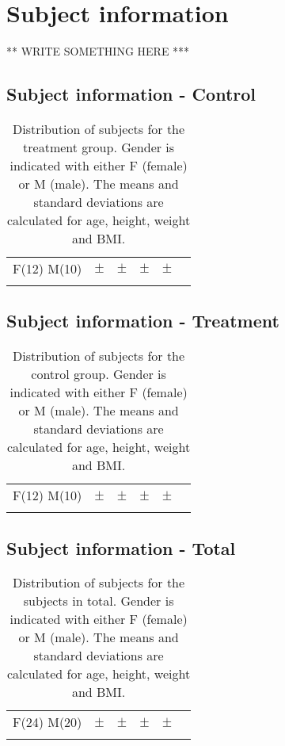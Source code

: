 \section{Subject information}

** WRITE SOMETHING HERE ***

\subsection{Subject information - Control}
\begin{longtable}{l|c|c|c|c|c}
	\rowcolor[HTML]{C0C0C0} \rule{0pt}{3ex}  \color[HTML]{000000}{Gender} & \color[HTML]{000000}{Age} & \color[HTML]{000000}{Weight} & \color[HTML]{000000}{Height} &  \color[HTML]{000000}{BMI} 
	\\ \hline \rule{0pt}{3ex} 
	F(12) M(10) & $\pm$ & $\pm$  &  $\pm$ &  $\pm$ 
	\\ \hline 
	\caption{Distribution of subjects for the treatment group. Gender is indicated with either F (female) or M (male). The means and standard deviations are calculated for age, height, weight and BMI.}
	\label{tab:subjects}
\end{longtable}
\vspace{-.5cm}


\subsection{Subject information - Treatment}
\begin{longtable}{l|c|c|c|c|c}
	\rowcolor[HTML]{C0C0C0} \rule{0pt}{3ex}  \color[HTML]{000000}{Gender} & \color[HTML]{000000}{Age} & \color[HTML]{000000}{Weight} & \color[HTML]{000000}{Height} &  \color[HTML]{000000}{BMI} 
	\\ \hline \rule{0pt}{3ex} 
	F(12) M(10) & $\pm$ & $\pm$  &  $\pm$ &  $\pm$ 
	\\ \hline 
	\caption{Distribution of subjects for the control group. Gender is indicated with either F (female) or M (male). The means and standard deviations are calculated for age, height, weight and BMI.}
	\label{tab:subjects}
\end{longtable}
\vspace{-.5cm}

\subsection{Subject information - Total}
\begin{longtable}{l|c|c|c|c|c}
	\rowcolor[HTML]{C0C0C0} \rule{0pt}{3ex}  \color[HTML]{000000}{Gender} & \color[HTML]{000000}{Age} & \color[HTML]{000000}{Weight} & \color[HTML]{000000}{Height} &  \color[HTML]{000000}{BMI} 
	\\ \hline \rule{0pt}{3ex} 
	F(24) M(20) & $\pm$ & $\pm$  &  $\pm$ &  $\pm$ 
	\\ \hline 
	\caption{Distribution of subjects for the subjects in total. Gender is indicated with either F (female) or M (male). The means and standard deviations are calculated for age, height, weight and BMI.}
	\label{tab:subjects}
\end{longtable}
\vspace{-.5cm}